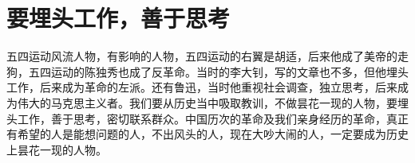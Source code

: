 \section[要埋头工作，善于思考（一九六七年二月）]{要埋头工作，善于思考}


五四运动风流人物，有影响的人物，五四运动的右翼是胡适，后来他成了美帝的走狗，五四运动的陈独秀也成了反革命。当时的李大钊，写的文章也不多，但他埋头工作，后来成为革命的左派。还有鲁迅，当时他重视社会调查，独立思考，后来成为伟大的马克思主义者。我们要从历史当中吸取教训，不做昙花一现的人物，要埋头工作，善于思考，密切联系群众。中国历次的革命及我们亲身经历的革命，真正有希望的人是能想问题的人，不出风头的人，现在大吵大闹的人，一定要成为历史上昙花一现的人物。


